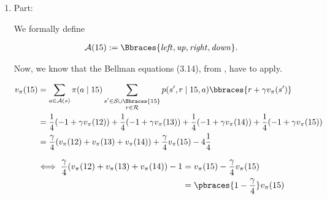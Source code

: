 \begin{solution}

\phantom{}

\begin{enumerate}[label = \arabic*.]

    \item Part:
    
    We formally define

    \begin{align*}
        \mathcal A(15)
        :=
        \Bbraces
        {
            \mathit{left},
            \mathit{up},
            \mathit{right},
            \mathit{down}
        }.
    \end{align*}

    Now, we know that the Bellman equations (3.14), from \cite*[page 59]{SuttonRichardS2018Rl:a}, have to apply.

    \begin{align*}
        v_\pi(15)
        & =
        \sum_{a \in \mathcal A(s)}
            \pi(a \mid 15)
            \sum_{\substack{s^\prime \in \mathcal S \cup \Bbraces{15} \\ r \in \mathcal R}}
                p(s^\prime, r \mid 15, a)
                \bbraces{r + \gamma v_\pi(s^\prime)} \\
        & =
        \frac{1}{4}
        (
            -1 + \gamma v_\pi(12)
        )
        +
        \frac{1}{4}
        (
            -1 + \gamma v_\pi(13)
        )
        +
        \frac{1}{4}
        (
            -1 + \gamma v_\pi(14)
        )
        +
        \frac{1}{4}
        (
            -1 + \gamma v_\pi(15)
        ) \\
        & =
        \frac{\gamma}{4}
        (
            v_\pi(12) + v_\pi(13) + v_\pi(14)
        )
        +
        \frac{\gamma}{4}
        v_\pi(15)
        -
        4
        \frac{1}{4}
    \end{align*}

    \begin{align*}
        \iff
        \frac{\gamma}{4}
        (
            v_\pi(12) + v_\pi(13) + v_\pi(14)
        )
        -
        1
        & =
        v_\pi(15) - \frac{\gamma}{4} v_\pi(15) \\
        & =
        \pbraces
        {
            1 - \frac{\gamma}{4}
        }
        v_\pi(15)
    \end{align*}


\end{enumerate}
\end{solution}
